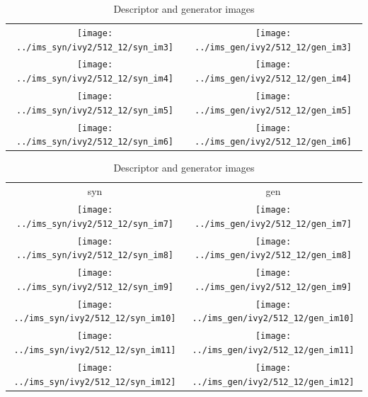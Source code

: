 \documentclass[letter]{article}
\begin{document}
\begin{table}[h!]
\begin{tabular}{cc}
		\texttt{[image: ../ims\_syn/ivy2/512\_12/syn\_im3]} & \texttt{[image: ../ims\_gen/ivy2/512\_12/gen\_im3]} \tabularnewline
		\texttt{[image: ../ims\_syn/ivy2/512\_12/syn\_im4]} & \texttt{[image: ../ims\_gen/ivy2/512\_12/gen\_im4]} \tabularnewline
		\texttt{[image: ../ims\_syn/ivy2/512\_12/syn\_im5]} & \texttt{[image: ../ims\_gen/ivy2/512\_12/gen\_im5]} \tabularnewline
		\texttt{[image: ../ims\_syn/ivy2/512\_12/syn\_im6]} & \texttt{[image: ../ims\_gen/ivy2/512\_12/gen\_im6]} \tabularnewline
	\end{tabular}
	\begin{tabular}{cc}
		syn & gen\tabularnewline
		\texttt{[image: ../ims\_syn/ivy2/512\_12/syn\_im7]} & \texttt{[image: ../ims\_gen/ivy2/512\_12/gen\_im7]} \tabularnewline
		\texttt{[image: ../ims\_syn/ivy2/512\_12/syn\_im8]} & \texttt{[image: ../ims\_gen/ivy2/512\_12/gen\_im8]} \tabularnewline
		\texttt{[image: ../ims\_syn/ivy2/512\_12/syn\_im9]} & \texttt{[image: ../ims\_gen/ivy2/512\_12/gen\_im9]} \tabularnewline
		\texttt{[image: ../ims\_syn/ivy2/512\_12/syn\_im10]} & \texttt{[image: ../ims\_gen/ivy2/512\_12/gen\_im10]} \tabularnewline
		\texttt{[image: ../ims\_syn/ivy2/512\_12/syn\_im11]} & \texttt{[image: ../ims\_gen/ivy2/512\_12/gen\_im11]} \tabularnewline
		\texttt{[image: ../ims\_syn/ivy2/512\_12/syn\_im12]} & \texttt{[image: ../ims\_gen/ivy2/512\_12/gen\_im12]} \tabularnewline
	\end{tabular}
	\caption{Descriptor and generator images}
\end{table}
\end{document}
